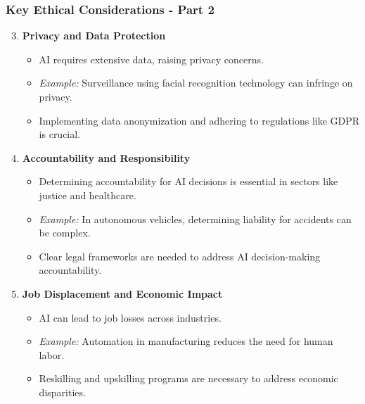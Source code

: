 \documentclass[aspectratio=169]{beamer}
\begin{document}
\begin{frame}[fragile]
    \frametitle{Key Ethical Considerations - Part 2}
    \begin{enumerate}
        \setcounter{enumi}{2} %
        \item \textbf{Privacy and Data Protection}
            \begin{itemize}
                \item AI requires extensive data, raising privacy concerns.
                \item \textit{Example:} Surveillance using facial recognition technology can infringe on privacy.
                \item Implementing data anonymization and adhering to regulations like GDPR is crucial.
            \end{itemize}
        
        \item \textbf{Accountability and Responsibility}
            \begin{itemize}
                \item Determining accountability for AI decisions is essential in sectors like justice and healthcare.
                \item \textit{Example:} In autonomous vehicles, determining liability for accidents can be complex.
                \item Clear legal frameworks are needed to address AI decision-making accountability.
            \end{itemize}
        
        \item \textbf{Job Displacement and Economic Impact}
            \begin{itemize}
                \item AI can lead to job losses across industries.
                \item \textit{Example:} Automation in manufacturing reduces the need for human labor.
                \item Reskilling and upskilling programs are necessary to address economic disparities.
            \end{itemize}
    \end{enumerate}
\end{frame}
\end{document}
